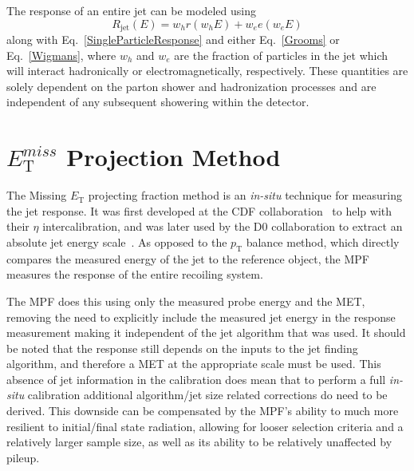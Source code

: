 The response of an entire jet can be modeled using
\begin{equation}
  R_{\mathrm{jet}}\left(E\right)=w_hr\left(w_hE\right)+w_ee\left(w_eE\right)
\end{equation}
along with Eq.~\ref{SingleParticleResponse} and either Eq.~\ref{Grooms} or Eq.~\ref{Wigmans}, where $w_h$ and  $w_e$ are the fraction of particles in the jet which will interact hadronically or electromagnetically, respectively.  
These quantities are solely dependent on the parton shower and hadronization processes and are independent of any subsequent showering within the detector.   

\section{$E_{\mathrm T}^{miss}$ Projection Method}
\label{METProj}

The Missing $E_{\mathrm T}$ projecting fraction method is an \textit{in-situ} technique for measuring the jet response.  
It was first developed at the CDF collaboration~\cite{abe1992dijet} to help with their $\eta$ intercalibration, and was later used by the D0 collaboration to extract an absolute jet energy scale~\cite{item/10150/186444}.  
As opposed to the $p_{\mathrm T}$ balance method, which directly compares the measured energy of the jet to the reference object, the MPF measures the response of the entire recoiling system.

The MPF does this using only the measured probe energy and the MET, removing the need to explicitly include the measured jet energy in the response measurement making it independent of the jet algorithm that was used.  
It should be noted that the response still depends on the inputs to the jet finding algorithm, and therefore a MET at the appropriate scale must be used.  
This absence of jet information in the calibration does mean that to perform a full \textit{in-situ} calibration additional algorithm/jet size related corrections do need to be derived.  
This downside can be compensated by the MPF's ability to much more resilient to initial/final state radiation, allowing for looser selection criteria and a relatively larger sample size, as well as its ability to be relatively unaffected by pileup.  

